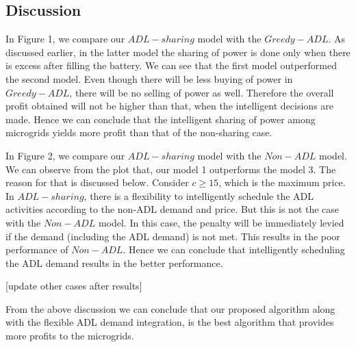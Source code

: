\subsection{Discussion}

In Figure 1, we compare our $ADL-sharing$ model with the $Greedy- ADL$. As discussed earlier, in the latter model the sharing of power is done only when there is excess after filling the battery. We can see that the first model outperformed the second model. Even though there will be less buying of power in $Greedy-ADL$, there will be no selling of power as well. Therefore  the overall profit obtained will not be higher than that, when the intelligent decisions are made. Hence we can conclude that the intelligent sharing of power among microgrids yields more profit than that of the non-sharing case. 

In Figure 2, we compare our $ADL-sharing$ model with the $Non-ADL$ model. We can observe from the plot that, our model 1 outperforms the model 3. The reason for that is discussed below. Consider $c \geq 15$, which is the maximum price. In $ADL-sharing$, there is a flexibility to intelligently schedule the ADL activities according to the non-ADL demand and price. But this is not the case with the $Non-ADL$ model. In this case, the penalty will be immediately levied if the demand (including the ADL demand) is not met. This results in the poor performance of $Non-ADL$. Hence we can conclude that intelligently scheduling the ADL demand results in the better performance. 

[update other cases after results]

From the above discussion we can conclude that our proposed algorithm along with the flexible ADL demand integration, is the best algorithm that provides more profits to the microgrids. 